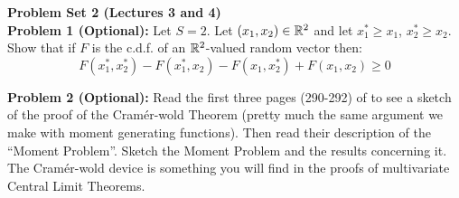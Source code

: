 \documentclass[11pt]{article} %
\begin{document}
\onehalfspace

\noindent \textbf{Problem Set 2 (Lectures 3 and 4)}\\

\noindent \textbf{Problem 1 (Optional):} Let $S=2$. Let $(x_1,x_2) \in \mathbb{R}^{2}$ and let $x_1^* \geq x_1$, $x_2^* \geq x_2$. Show that if $F$ is the c.d.f. of an $\mathbb{R}^2$-valued random vector then: 
$$F(x_1^*, x_2^*)-F(x_1^*, x_2)-F(x_1, x_2^*)+F(x_1, x_2) \geq 0$$

\noindent \textbf{Problem 2 (Optional):} Read the first three pages (290-292) of \cite{cramer1936some} to see a sketch of the proof of the Cram\'er-wold Theorem (pretty much the same argument we make with moment generating functions). Then read their description of the ``Moment Problem''. Sketch the Moment Problem and the results concerning it.   \\

 The Cram\'er-wold device is something you will find in the proofs of multivariate Central Limit Theorems. \\
  
\end{document}
